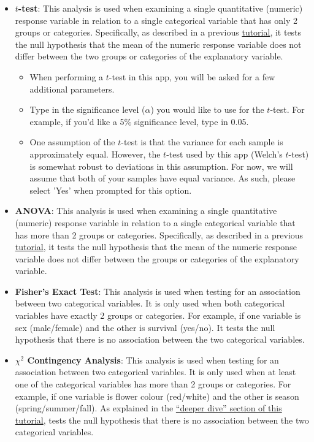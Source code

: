 \documentclass[
]{book}
\providecommand{\tightlist}{%
  \setlength{\itemsep}{0pt}\setlength{\parskip}{0pt}}
\begin{document}
\begin{itemize}
\item
  \textbf{\(t\)-test}: This analysis is used when examining a single quantitative (numeric) response variable in relation to a single categorical variable that has only 2 groups or categories. Specifically, as described in a previous \href{https://ubco-biology.github.io/BIOL-116-Lab-Manual/which-statistical-test-to-use.html\#comparing-means-among-treatment-groups}{tutorial}, it tests the null hypothesis that the mean of the numeric response variable does not differ between the two groups or categories of the explanatory variable.

  \begin{itemize}
  \tightlist
  \item
    When performing a \(t\)-test in this app, you will be asked for a few additional parameters.
  \item
    Type in the significance level (\(\alpha\)) you would like to use for the \(t\)-test. For example, if you'd like a 5\% significance level, type in 0.05.
  \item
    One assumption of the \(t\)-test is that the variance for each sample is approximately equal. However, the \(t\)-test used by this app (Welch's \(t\)-test) is somewhat robust to deviations in this assumption. For now, we will assume that both of your samples have equal variance. As such, please select 'Yes' when prompted for this option.
  \end{itemize}
\item
  \textbf{ANOVA}: This analysis is used when examining a single quantitative (numeric) response variable in relation to a single categorical variable that has more than 2 groups or categories. Specifically, as described in a previous \href{https://ubco-biology.github.io/BIOL-116-Lab-Manual/which-statistical-test-to-use.html\#scenario-1-continuous-numeric-dependent-variable-and-categorical-independent-variable}{tutorial}, it tests the null hypothesis that the mean of the numeric response variable does not differ between the groups or categories of the explanatory variable.
\item
  \textbf{Fisher's Exact Test}: This analysis is used when testing for an association between two categorical variables. It is only used when both categorical variables have exactly 2 groups or categories. For example, if one variable is sex (male/female) and the other is survival (yes/no). It tests the null hypothesis that there is no association between the two categorical variables.
\item
  \textbf{\(\chi^2\) Contingency Analysis}: This analysis is used when testing for an association between two categorical variables. It is only used when at least one of the categorical variables has more than 2 groups or categories. For example, if one variable is flower colour (red/white) and the other is season (spring/summer/fall). As explained in the \href{https://ubco-biology.github.io/BIOL-116-Lab-Manual/which-statistical-test-to-use.html\#comparing-frequencies-to-a-baseline-expectation}{``deeper dive'' section of this tutorial}, tests the null hypothesis that there is no association between the two categorical variables.
\end{itemize}
\end{document}
